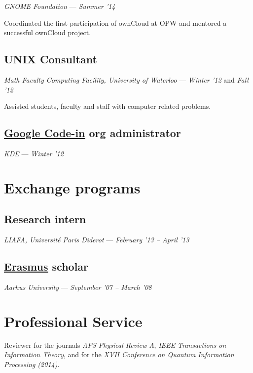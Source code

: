 \documentclass[]{article}
\begin{document}
\emph{GNOME Foundation} --- \emph{Summer '14}

Coordinated the first participation of ownCloud at OPW and mentored a
successful ownCloud project.

\subsection{UNIX Consultant}\label{unix-consultant}

\emph{Math Faculty Computing Facility, University of Waterloo} ---
\emph{Winter '12} and \emph{Fall '12}

Assisted students, faculty and staff with computer related problems.

\subsection{\href{https://www.google-melange.com/gci/homepage/google/gci2012}{Google
Code-in} org
administrator}\label{google-code-incodein-org-administrator}

\emph{KDE} --- \emph{Winter '12}

\section{Exchange programs}\label{exchange-programs}

\subsection{Research intern}\label{research-intern}

\emph{LIAFA, Université Paris Diderot} --- \emph{February '13 -- April
'13}

\subsection{\href{http://en.wikipedia.org/wiki/Erasmus_Programme}{Erasmus}
scholar}\label{erasmus-scholar}

\emph{Aarhus University} --- \emph{September '07 -- March '08}

\section{Professional Service}\label{professional-service}

Reviewer for the journals \emph{APS Physical Review A}, \emph{IEEE
Transactions on Information Theory}, and for the \emph{XVII Conference
on Quantum Information Processing (2014)}.
\end{document}
